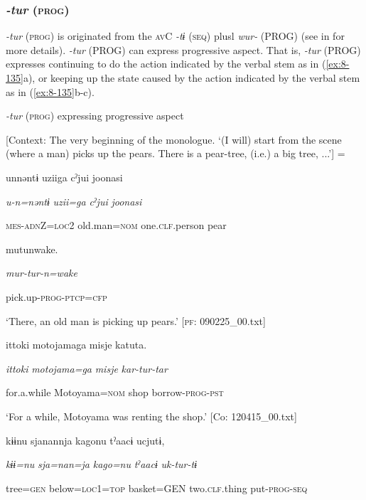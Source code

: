\subsubsection{\textit{{}-tur} (\textsc{prog})}

\textit{{}-tur} (\textsc{prog}) is originated from the \textsc{av}C \textit{{}-tɨ} (\textsc{seq}) plusl \textit{wur-} (PROG) (see  in  for more details). \textit{{}-tur} (PROG) can express progressive aspect. That is, \textit{{}-tur} (PROG) expresses continuing to do the action indicated by the verbal stem as in (\ref{ex:8-135}a), or keeping up the state caused by the action indicated by the verbal stem as in (\ref{ex:8-135}b-c).

\ea\label{ex:8-135}
  \textit{{}-tur} (\textsc{prog}) expressing progressive aspect

  [Context: The very beginning of the monologue. {\TM}
\glll ‘(I will) start from the scene (where a man) picks up the pears. There is a pear-tree, (i.e.) a big tree, ...’] = 

\ea {\TM}
\glll  unnəntɨ  uziiga  cˀjui  joonasi

      \textit{u-n=nəntɨ}  \textit{uzii=ga}  \textit{cˀjui}  \textit{joonasi}

      \textsc{mes}-\textsc{adn}Z=\textsc{loc}2  old.man=\textsc{nom}  one.\textsc{clf}.person  pear

      mutunwake.

      \textit{mur-tur{}-n=wake}

      pick.up-\textsc{prog}-\textsc{ptcp}=\textsc{cfp}

\glt ‘There, an old man is picking up pears.’ [\textsc{pf}: 090225\_00.txt]
\ex [= (\ref{ex:6-134}a)]

    {\TM}
\glll  {\textbar}ittoki{\textbar}  motojamaga  misje  katuta.

      \textit{ittoki}  \textit{motojama=ga}  \textit{misje}  \textit{kar-tur{}-tar}

      for.a.while  Motoyama=\textsc{nom}  shop  borrow-\textsc{prog}-\textsc{pst}

\glt ‘For a while, Motoyama was renting the shop.’ [Co: 120415\_00.txt]
\ex [= (\ref{ex:6-62}a)]

    {\TM}
\glll  kɨɨnu  sjanannja  kagonu  tˀaacɨ  ucjutɨ,

      \textit{kɨɨ=nu}  \textit{sja=nan=ja}  \textit{kago=nu}  \textit{tˀaacɨ}  \textit{uk-tur{}-tɨ}

      tree=\textsc{gen}  below=\textsc{loc}1=\textsc{top}  basket=GEN  two.\textsc{clf}.thing  put-\textsc{prog}-\textsc{seq}

